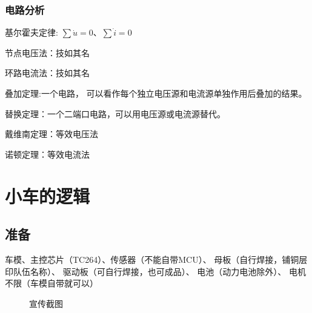 \documentclass[cn,12pt]{elegantbook}
\begin{document}
\subsection{电路分析}

基尔霍夫定律: $\sum \dot{u}=0$、$ \sum \dot{i} = 0$

节点电压法：技如其名

环路电流法：技如其名

叠加定理:一个电路，
可以看作每个独立电压源和电流源单独作用后叠加的结果。

替换定理：一个二端口电路，可以用电压源或电流源替代。

戴维南定理：等效电压法

诺顿定理：等效电流法








\chapter{小车的逻辑}

\section{准备}

车模、主控芯片（TC264）、传感器（不能自带MCU）、
母板（自行焊接，铺铜层印队伍名称）、
驱动板（可自行焊接，也可成品）、
电池（动力电池除外）、
电机不限（车模自带就可以）

    \begin{figure}[H]
        \hspace{4em}
        \caption{宣传截图}%
    \end{figure}
\end{document}
